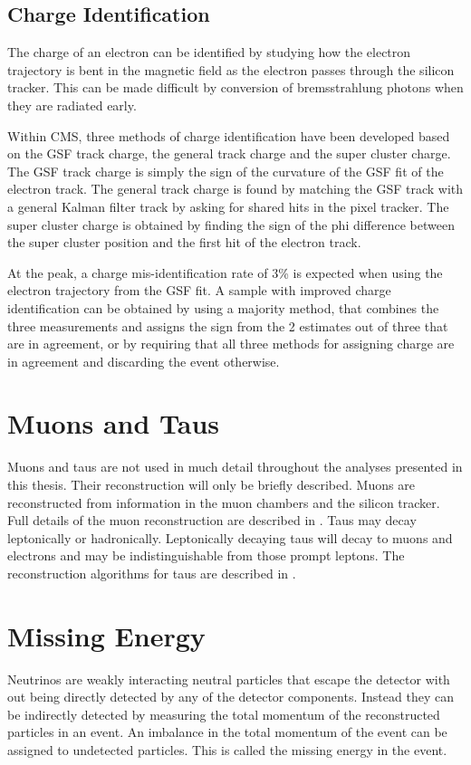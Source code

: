 \subsection{Charge Identification}
The charge of an electron can be identified by studying how the electron
trajectory is bent in the magnetic field as the electron passes through the
silicon tracker. This can be made difficult by conversion of bremsstrahlung
photons when they are radiated early.

Within CMS, three methods of charge identification have been developed based on
the GSF track charge, the general track charge and the super cluster charge. The
GSF track charge is simply the sign of the curvature of the GSF fit of the
electron track. The general track charge is found by matching the GSF track with
a general Kalman filter track by asking for shared hits in the pixel tracker. 
The super cluster charge is obtained by finding the sign of the phi difference
between the super cluster position and the first hit of the electron track.

At the \PZ peak, a charge mis-identification rate of \unit{3}{\%} \cite{eReco}
is expected when using the electron trajectory from the GSF fit.  A sample with
improved charge identification can be obtained by using a majority method, that
combines the three measurements and assigns the sign from the 2 estimates out of
three that are in agreement, or by requiring that all three methods for
assigning charge are in agreement and discarding the event otherwise.

\section{Muons and Taus}
Muons and taus are not used in much detail throughout the analyses presented in
this thesis. Their reconstruction will only be briefly described. 
Muons are reconstructed from information in the muon chambers and the silicon
tracker.  Full details of the muon reconstruction are described in \cite{}.
Taus may decay leptonically or hadronically. Leptonically decaying taus will
decay to muons and electrons and may be indistinguishable from those prompt
leptons. The reconstruction algorithms for taus are described in \cite{}.

\section{Missing Energy} 
Neutrinos are weakly interacting neutral particles that escape the
detector with out being directly detected by any of the detector components. 
Instead they can be indirectly detected by measuring the total momentum of the
reconstructed particles in an event.
An imbalance in the total momentum of the event can be assigned to undetected
particles. This is called the missing energy in the event.

